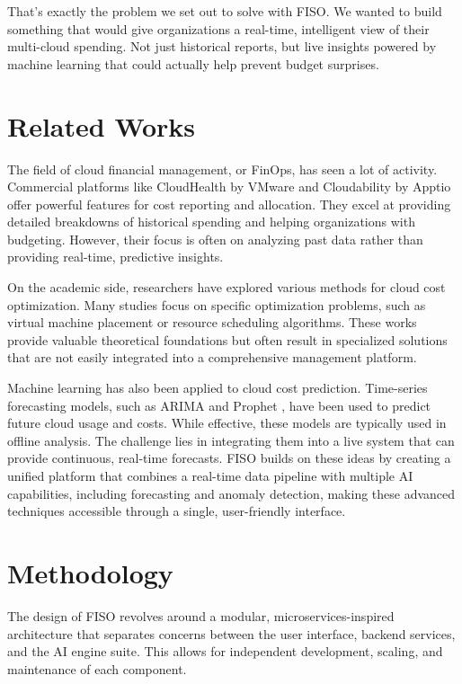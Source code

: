 \documentclass[conference]{IEEEtran}
\begin{document}
That's exactly the problem we set out to solve with FISO. We wanted to build something that would give organizations a real-time, intelligent view of their multi-cloud spending. Not just historical reports, but live insights powered by machine learning that could actually help prevent budget surprises.

\section{Related Works}

The field of cloud financial management, or FinOps, has seen a lot of activity. Commercial platforms like CloudHealth by VMware and Cloudability by Apptio offer powerful features for cost reporting and allocation. They excel at providing detailed breakdowns of historical spending and helping organizations with budgeting. However, their focus is often on analyzing past data rather than providing real-time, predictive insights.

On the academic side, researchers have explored various methods for cloud cost optimization. Many studies focus on specific optimization problems, such as virtual machine placement \cite{vm_placement} or resource scheduling algorithms. These works provide valuable theoretical foundations but often result in specialized solutions that are not easily integrated into a comprehensive management platform.

Machine learning has also been applied to cloud cost prediction. Time-series forecasting models, such as ARIMA and Prophet \cite{prophet}, have been used to predict future cloud usage and costs. While effective, these models are typically used in offline analysis. The challenge lies in integrating them into a live system that can provide continuous, real-time forecasts. FISO builds on these ideas by creating a unified platform that combines a real-time data pipeline with multiple AI capabilities, including forecasting and anomaly detection, making these advanced techniques accessible through a single, user-friendly interface.

\section{Methodology}

The design of FISO revolves around a modular, microservices-inspired architecture that separates concerns between the user interface, backend services, and the AI engine suite. This allows for independent development, scaling, and maintenance of each component.
\end{document}
